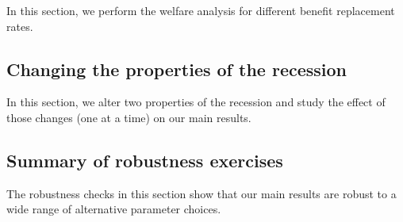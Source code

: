 \documentclass[\latexroot/\projectname]{subfiles}
\begin{document}
In this section, we perform the welfare analysis for different benefit replacement rates.

\FloatBarrier
\hypertarget{changing-the-properties-of-the-recession}{}\par\subsection*{Changing the properties of the recession}

In this section, we alter two properties of the recession and study the effect of those changes (one at a time) on our main results.


\FloatBarrier
%


\hypertarget{summary-of-robustness-exercises}{}\par\subsection*{Summary of robustness exercises}
\whenintegrated{\label{sec:robust_summary}} %

The robustness checks in this section show that our main results are robust to a wide range of alternative parameter choices.


\smartbib
\end{document}
